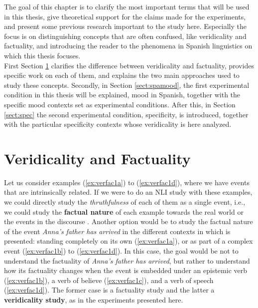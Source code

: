 \label{chap:back}
The goal of this chapter is to clarify the most important terms that will be used in this thesis, give theoretical support for the claims made for the experiments, and present some previous research important to the study here. Especially the focus is on distinguishing concepts that are often confused, like veridicality and factuality, and introducing the reader to the phenomena in Spanish linguistics on which this thesis focuses.\\

First Section \ref{sect:verandfact} clarifies the difference between veridicality and factuality, provides specific work on each of them, and explains the two main approaches used to study these concepts. Secondly, in Section \ref{sect:spamood}, the first experimental condition in this thesis will be explained, mood in Spanish, together with the specific mood contexts set as experimental conditions. After this, in Section \ref{sect:spec} the second experimental condition, specificity, is introduced, together with the particular specificity contexts whose veridicality is here analyzed.\\

\section{Veridicality and Factuality}
\label{sect:verandfact}

Let us consider examples (\ref{ex:verfac1a}) to (\ref{ex:verfac1d}), where we have events that are intrinsically related. If we were to do an NLI study with these examples, we could directly study the \textit{thruthfulness} of each of them as a single event, i.e., we could study the \textbf{factual nature} of each example towards the real world or the events in the discourse \citep{sauri2009factbank}. Another option would be to study the factual nature of the event \textit{Anna's father has arrived} in the different contexts in which is presented: standing completely on its own (\ref{ex:verfac1a}), or as part of a complex event (\ref{ex:verfac1b}) to (\ref{ex:verfac1d}). In this case, the goal would be not to understand the factuality of \textit{Anna's father has arrived}, but rather to understand how its factuality changes when the event is embedded under an epistemic verb (\ref{ex:verfac1b}), a verb of believe (\ref{ex:verfac1c}), and a verb of speech (\ref{ex:verfac1d}). The former case is a factuality study and the latter a \textbf{veridicality study}, as in the experiments presented here.\\


